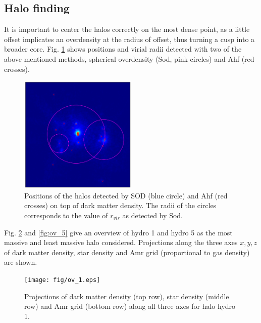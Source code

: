 \documentclass[useAMS,usenatbib]{mn2e}
\newcommand{\TODO}[1]{\textsc{\textbf{\textcolor{red}{(TODO: #1)}}}}
\begin{document}

\subsection{Halo finding}
It is important to center the halos correctly on the most dense point,
as a little offset implicates an overdensity at the radius of offset,
thus turning a cusp into a broader core.
Fig. \ref{fig:vis_proj_dm_sod_ahf} shows positions and virial radii
detected with two of the above mentioned methods, spherical
overdensity ({\sc Sod}, pink circles) and {\sc Ahf} (red crosses).

\begin{figure}
  \begin{center}
    \includegraphics[width=0.5\textwidth]{fig/sod_ahf.eps}
  \end{center}
  \caption{\label{fig:vis_proj_dm_sod_ahf}Positions of the halos
    detected by SOD (blue circle) and {\sc Ahf} (red crosses) on top
    of dark matter density. The radii of the circles corresponds to
    the value of $r_{vir}$ as detected by {\sc Sod}.}
\end{figure}

Fig. \ref{fig:ov_1} and \ref{fig:ov_5} give an overview of {\sc hydro
  1} and {\sc hydro 5} as the most massive and least massive halo
considered. Projections along the three axes $x,y,z$ of dark matter
density, star density and {\sc Amr} grid (proportional to gas density)
are shown.
\begin{figure}
  \begin{center}
    \texttt{[image: fig/ov\_1.eps]}
  \end{center}
  \caption{\label{fig:ov_1}Projections of dark matter density (top
    row), star density (middle row) and {\sc Amr} grid (bottom row)
    along all three axes for halo {\sc hydro 1}.}
\end{figure}
\end{document}
